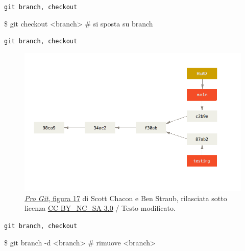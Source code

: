 \documentclass{beamer}
\begin{document}
\begin{frame}{\texttt{git branch, checkout}}
  \begin{semiverbatim}
    \$ git checkout <branch> \# si sposta su branch
  \end{semiverbatim}
\end{frame}

\begin{frame}{\texttt{git branch, checkout}}
  \begin{semiverbatim}
  \begin{figure}
    \includegraphics[width=\textwidth]{assets/advance-main.png}
    \caption{
      \href{https://git-scm.com/book/en/v2/Git-Branching-Branches-in-a-Nutshell}{\emph{Pro Git},
      figura 17} di Scott Chacon e Ben Straub, rilasciata sotto licenza
      \href{https://creativecommons.org/licenses/by-nc-sa/3.0/}{CC
      BY\_NC\_SA 3.0} / Testo modificato.
    }
  \end{figure}
  \end{semiverbatim}
\end{frame}

\begin{frame}{\texttt{git branch, checkout}}
  \begin{semiverbatim}
    \$ git branch -d <branch> \# rimuove <branch>
  \end{semiverbatim}
\end{frame}
\end{document}
